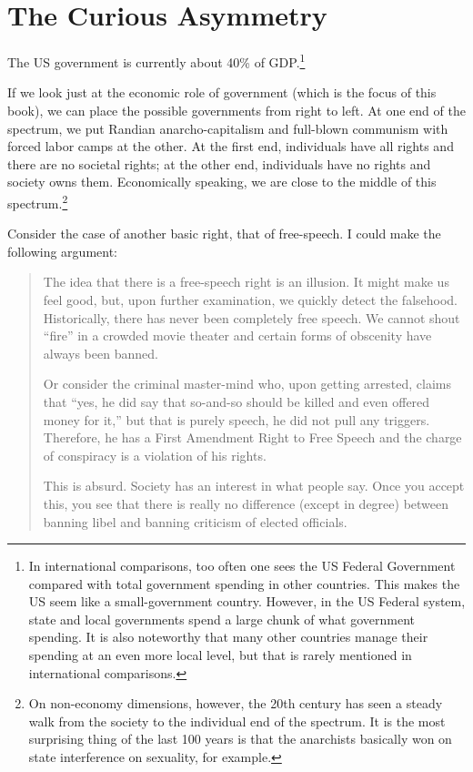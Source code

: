 \chapter{The Curious Asymmetry}

The US government is currently about 40\% of GDP.\footnote{In international
comparisons, too often one sees the US Federal Government compared with total
government spending in other countries. This makes the US seem like a
small-government country. However, in the US Federal system, state and local
governments spend a large chunk of what government spending. It is also
noteworthy that many other countries manage their spending at an even more
local level, but that is rarely mentioned in international comparisons.}

If we look just at the economic role of government (which is the focus of this
book), we can place the possible governments from right to left. At one end of
the spectrum, we put Randian anarcho-capitalism and full-blown communism with
forced labor camps at the other. At the first end, individuals have all rights
and there are no societal rights; at the other end, individuals have no rights
and society owns them. Economically speaking, we are close to the middle of
this spectrum.\footnote{On non-economy dimensions, however, the 20th century
has seen a steady walk from the society to the individual end of the spectrum.
It is the most surprising thing of the last 100 years is that the anarchists
basically won on state interference on sexuality, for example.}

Consider the case of another basic right, that of free-speech. I could make the
following argument:

\begin{quote}
The idea that there is a free-speech right is an illusion. It might make us
feel good, but, upon further examination, we quickly detect the falsehood.
Historically, there has never been completely free speech. We cannot shout
``fire'' in a crowded movie theater and certain forms of obscenity have always
been banned.

Or consider the criminal master-mind who, upon getting arrested, claims that
``yes, he did say that so-and-so should be killed and even offered money for
it,'' but that is purely speech, he did not pull any triggers. Therefore, he
has a First Amendment Right to Free Speech and the charge of conspiracy is a
violation of his rights.

This is absurd. Society has an interest in what people say. Once you accept
this, you see that there is really no difference (except in degree) between
banning libel and banning criticism of elected officials.
\end{quote}


